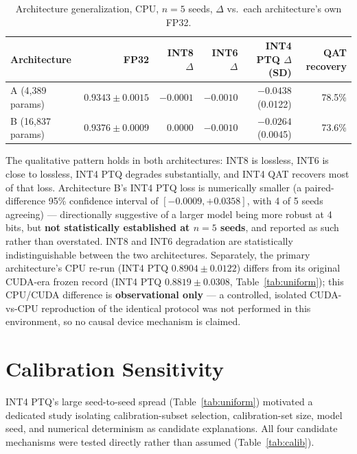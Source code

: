 \documentclass[11pt]{article}
\begin{document}
\begin{table}[h]
\centering
\caption{Architecture generalization, CPU, $n=5$ seeds, $\Delta$ vs.\ each architecture's own FP32.}
\label{tab:arch}
\footnotesize
\begin{tabular}{lrrrrr}
\toprule
Architecture & FP32 & INT8 $\Delta$ & INT6 $\Delta$ & INT4 PTQ $\Delta$ (SD) & QAT recovery \\
\midrule
A (4{,}389 params)  & $0.9343 \pm 0.0015$ & $-0.0001$ & $-0.0010$ & $-0.0438$ (0.0122) & 78.5\% \\
B (16{,}837 params) & $0.9376 \pm 0.0009$ & $0.0000$  & $-0.0010$ & $-0.0264$ (0.0045) & 73.6\% \\
\bottomrule
\end{tabular}
\end{table}

The qualitative pattern holds in both architectures: INT8 is lossless, INT6 is close to lossless, INT4
PTQ degrades substantially, and INT4 QAT recovers most of that loss. Architecture B's INT4 PTQ loss is
numerically smaller (a paired-difference 95\% confidence interval of $[-0.0009, +0.0358]$, with 4 of 5
seeds agreeing) --- directionally suggestive of a larger model being more robust at 4 bits, but
\textbf{not statistically established at $n=5$ seeds}, and reported as such rather than overstated.
INT8 and INT6 degradation are statistically indistinguishable between the two architectures. Separately,
the primary architecture's CPU re-run (INT4 PTQ $0.8904 \pm 0.0122$) differs from its original
CUDA-era frozen record (INT4 PTQ $0.8819 \pm 0.0308$, Table~\ref{tab:uniform}); this CPU/CUDA
difference is \textbf{observational only} --- a controlled, isolated CUDA-vs-CPU reproduction of the
identical protocol was not performed in this environment, so no causal device mechanism is claimed.

\section{Calibration Sensitivity}
\label{sec:calibration}

INT4 PTQ's large seed-to-seed spread (Table~\ref{tab:uniform}) motivated a dedicated study isolating
calibration-subset selection, calibration-set size, model seed, and numerical determinism as candidate
explanations. All four candidate mechanisms were tested directly rather than assumed
(Table~\ref{tab:calib}).
\end{document}
